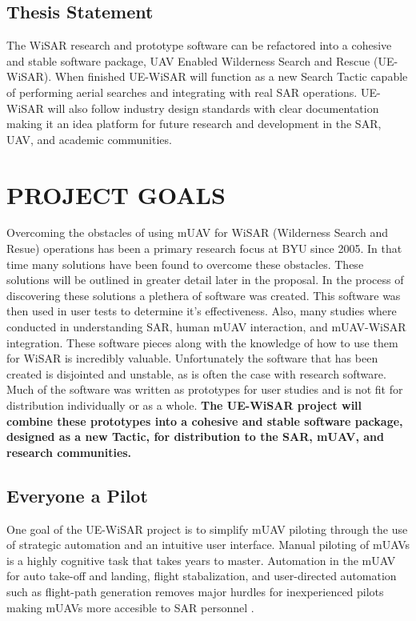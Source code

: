\documentclass[12pt]{IEEEtran}
\begin{document}
\subsection{Thesis Statement}
The WiSAR research and prototype software can be refactored into a cohesive
and stable software package, UAV Enabled Wilderness Search and Rescue
(UE-WiSAR).
When finished UE-WiSAR will function as a new Search Tactic capable of performing aerial searches and integrating
with real SAR operations.
UE-WiSAR will also follow industry design standards with clear documentation
making it an idea platform for future research and development in the SAR, UAV,
and academic communities.

\section{PROJECT GOALS}
Overcoming the obstacles of using mUAV for WiSAR (Wilderness Search and Resue)
operations has been a primary research focus at BYU since 2005.  In that time many solutions have been found
to overcome these obstacles.  These solutions will be outlined in greater detail
later in the proposal.  In the process of discovering these solutions a plethera
of software was created.  This software was then used in user tests to determine
it's effectiveness.  Also, many studies where conducted in understanding SAR,
human mUAV interaction, and mUAV-WiSAR integration.  These software pieces along
with the knowledge of how to use them for WiSAR is incredibly valuable. 
Unfortunately the software that has been created is disjointed and unstable, as
is often the case with research software.
Much of the software was written as prototypes for user studies and is not fit
for distribution individually or as a whole.  \textbf{The UE-WiSAR project will
combine these prototypes into a cohesive and stable software package, designed
as a new Tactic, for distribution to the SAR, mUAV, and research communities.}

\subsection{Everyone a Pilot}
One goal of the UE-WiSAR project is to simplify mUAV piloting through the use of
strategic automation and an intuitive user interface.  Manual piloting of mUAVs
is a highly cognitive task that takes years to master.  Automation in the mUAV
for auto take-off and landing, flight stabalization, and user-directed
automation such as flight-path generation removes major hurdles for
inexperienced pilots making mUAVs more accesible to SAR personnel
\cite{cooper2007supporting}.
\end{document}
